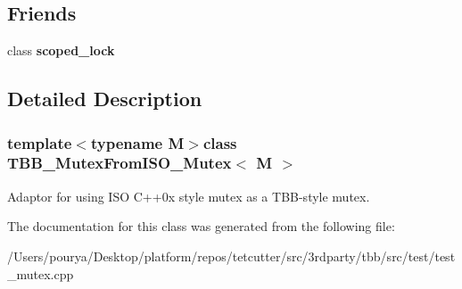 \subsection*{Friends}
\begin{DoxyCompactItemize}
\item 
\hypertarget{classTBB__MutexFromISO__Mutex_afcf922650b2fd9d76b7b939d8511bbd8}{}class {\bfseries scoped\+\_\+lock}\label{classTBB__MutexFromISO__Mutex_afcf922650b2fd9d76b7b939d8511bbd8}

\end{DoxyCompactItemize}


\subsection{Detailed Description}
\subsubsection*{template$<$typename M$>$class T\+B\+B\+\_\+\+Mutex\+From\+I\+S\+O\+\_\+\+Mutex$<$ M $>$}

Adaptor for using I\+S\+O C++0x style mutex as a T\+B\+B-\/style mutex. 

The documentation for this class was generated from the following file\+:\begin{DoxyCompactItemize}
\item 
/\+Users/pourya/\+Desktop/platform/repos/tetcutter/src/3rdparty/tbb/src/test/test\+\_\+mutex.\+cpp\end{DoxyCompactItemize}
